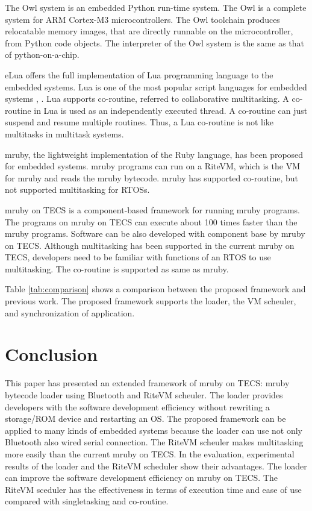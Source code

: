 \documentclass[submit]{ipsj_v2/UTF8/ipsj}
\begin{document}
The Owl system is an embedded Python run-time system.
The Owl is a complete system for ARM Cortex-M3 microcontrollers.
The Owl toolchain produces relocatable memory images, that are directly runnable on the microcontroller, from Python code objects.
The interpreter of the Owl system is the same as that of python-on-a-chip.

eLua offers the full implementation of Lua programming language to the embedded systems.
Lua is one of the most popular script languages for embedded systems \cite{url:Lua}, \cite{par:Lua}.
Lua supports co-routine, referred to collaborative multitasking.
A co-routine in Lua is used as an independently executed thread.
A co-routine can just suspend and resume multiple routines.
Thus, a Lua co-routine is not like multitasks in multitask systems.

mruby, the lightweight implementation of the Ruby language, has been proposed for embedded systems.
mruby programs can run on a RiteVM, which is the VM for mruby and reads the mruby bytecode.
mruby has supported co-routine, but not supported multitasking for RTOSs.

mruby on TECS is a component-based framework for running mruby programs.
The programs on mruby on TECS can execute about 100 times faster than the mruby programs.
Software can be also developed with component base by mruby on TECS.
Although multitasking has been supported in the current mruby on TECS, developers need to be familiar with functions of an RTOS to use multitasking.
The co-routine is supported as same as mruby.

Table \ref{tab:comparison} shows a comparison between the proposed framework and previous work.
The proposed framework supports the loader, the VM scheuler, and synchronization of application.
 
\section{Conclusion}
\label{sec:Conclusion}
This paper has presented an extended framework of mruby on TECS: mruby bytecode loader using Bluetooth and RiteVM scheuler.
The loader provides developers with the software development efficiency without rewriting a storage/ROM device and restarting an OS.
The proposed framework can be applied to many kinds of embedded systems  because the loader can use not only Bluetooth also wired serial connection.
The RiteVM scheuler makes multitasking more easily than the current mruby on TECS.
In the evaluation, experimental results of the loader and the RiteVM scheduler show their advantages.
The loader can improve the software development efficiency on mruby on TECS.
The RiteVM sceduler has the effectiveness in terms of execution time and ease of use compared with singletasking and co-routine.
\end{document}
